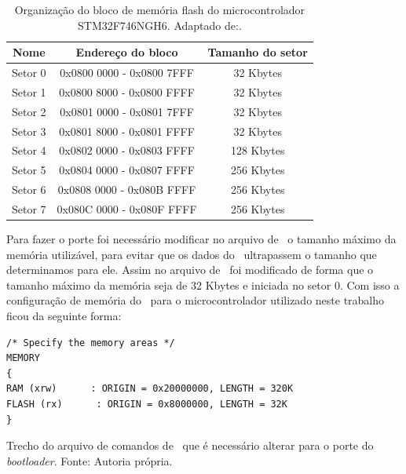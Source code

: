 \begin{table}[H]
    \scriptsize
    \centering
    \begin{tabular}{|c|c|c|}

    \hline
    Nome    & Endereço do bloco         & Tamanho do setor \\ \hline
    Setor 0 & 0x0800 0000 - 0x0800 7FFF & 32 Kbytes        \\ \hline
    Setor 1 & 0x0800 8000 - 0x0800 FFFF & 32 Kbytes        \\ \hline
    Setor 2 & 0x0801 0000 - 0x0801 7FFF & 32 Kbytes        \\ \hline
    Setor 3 & 0x0801 8000 - 0x0801 FFFF & 32 Kbytes        \\ \hline
    Setor 4 & 0x0802 0000 - 0x0803 FFFF & 128 Kbytes       \\ \hline
    Setor 5 & 0x0804 0000 - 0x0807 FFFF & 256 Kbytes       \\ \hline
    Setor 6 & 0x0808 0000 - 0x080B FFFF & 256 Kbytes       \\ \hline
    Setor 7 & 0x080C 0000 - 0x080F FFFF & 256 Kbytes       \\ \hline
    \end{tabular}
    \caption{Organização do bloco de memória flash do microcontrolador STM32F746NGH6. \newline Adaptado de:\cite{STM32F7}.}
    \label{STM32F7_FLASH}
    \end{table}


Para fazer o porte foi necessário modificar no arquivo de \linker\ o tamanho máximo da memória utilizável, para evitar que os dados do \bootloader\ ultrapassem o tamanho que determinamos para ele. Assim no arquivo de \linker\ foi modificado de forma que o tamanho máximo da memória seja de 32 Kbytes e iniciada no setor 0. Com isso a configuração de memória do \bootloader\ para o microcontrolador utilizado neste trabalho ficou da seguinte forma:


\begin{algorithm}[H]
\begin{lstlisting}
/* Specify the memory areas */
MEMORY
{
RAM (xrw)      : ORIGIN = 0x20000000, LENGTH = 320K
FLASH (rx)      : ORIGIN = 0x8000000, LENGTH = 32K
}

\end{lstlisting}
\caption{Trecho do arquivo de comandos de \linker\ que é necessário alterar para o porte do \textit{bootloader}.
\newline Fonte: Autoria própria.}
\end{algorithm}

